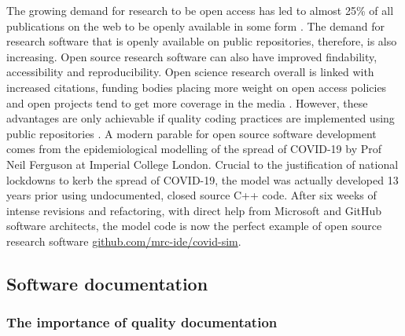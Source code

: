 \documentclass[../main.tex]{subfiles}
\begin{document}
The growing demand for research to be open access has led to almost 25\% of all publications on the web to be openly available in some form \parencite{Khabsa2014}.
The demand for research software that is openly available on public repositories, therefore, is also increasing. 
Open source research software can also have improved findability, accessibility and reproducibility.
Open science research overall is linked with increased citations, funding bodies placing more weight on open access policies and open projects tend to get more coverage in the media \parencite{McKiernan2016}.
However, these advantages are only achievable if quality coding practices are implemented using public repositories \parencite{Prlic2012}.
A modern parable for open source software development comes from the epidemiological modelling of the spread of COVID-19 by Prof Neil Ferguson at Imperial College London.
Crucial to the justification of national lockdowns to kerb the spread of COVID-19, the model was actually developed 13 years prior using undocumented, closed source C++ code.
After six weeks of intense revisions and refactoring, with direct help from Microsoft and GitHub software architects, the model code is now the perfect example of open source research software \href{https://github.com/mrc-ide/covid-sim}{github.com/mrc-ide/covid-sim}.

\subsection{Software documentation}

\subsubsection{The importance of quality documentation}
\end{document}
